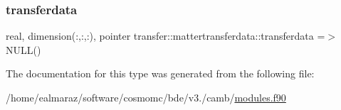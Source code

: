\subsubsection{\texorpdfstring{transferdata}{transferdata}}
{\footnotesize\ttfamily real, dimension(\+:,\+:,\+:), pointer transfer\+::mattertransferdata\+::transferdata =$>$ N\+U\+LL()}



The documentation for this type was generated from the following file\+:\begin{DoxyCompactItemize}
\item 
/home/ealmaraz/software/cosmomc/bde/v3./camb/\mbox{\hyperlink{modules_8f90}{modules.\+f90}}\end{DoxyCompactItemize}
